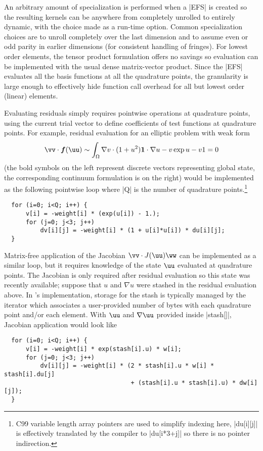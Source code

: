 An arbitrary amount of specialization is performed when a \cverb|EFS| is created so the resulting kernels can be anywhere from completely unrolled to entirely dynamic, with the choice made as a run-time option.
Common specialization choices are to unroll completely over the last dimension and to assume even or odd parity in earlier dimensions (for consistent handling of fringes).
For lowest order elements, the tensor product formulation offers no savings so evaluation can be implemented with the usual dense matrix-vector product.
Since the \cverb|EFS| evaluates all the basis functions at all the quadrature points, the granularity is large enough to effectively hide function call overhead for all but lowest order (linear) elements.

Evaluating residuals simply requires pointwise operations at quadrature points, using the current trial vector to define coefficients of test functions at quadrature points.
For example, residual evaluation for an elliptic problem with weak form
\begin{align*}
  \vv\cdot \bm f(\uu) \sim \int_\Omega \nabla v \cdot (1+u^2)\bm 1 \cdot \nabla u - v \exp u - v 1 = 0
\end{align*}
(the bold symbols on the left represent discrete vectors representing global state, the corresponding continuum formulation is on the right)
would be implemented as the following pointwise loop where \cverb|Q| is the number of quadrature points.\footnote{C99 variable length array pointers are used to simplify indexing here, \cverb|du[i][j]| is effectively translated by the compiler to \cverb|du[i*3+j]| so there is no pointer indirection.}
\begin{verbatim}
  for (i=0; i<Q; i++) {
      v[i] = -weight[i] * (exp(u[i]) - 1.);
      for (j=0; j<3; j++)
          dv[i][j] = -weight[i] * (1 + u[i]*u[i]) * du[i][j];
  }
\end{verbatim}
Matrix-free application of the Jacobian $\vv \cdot J(\uu) \ww$ can be implemented as a similar loop, but it requires knowledge of the state $\uu$ evaluated at quadrature points.
The Jacobian is only required after residual evaluation so this state was recently available; suppose that $u$ and $\nabla u$ were stashed in the residual evaluation above.
In \Dohp's implementation, storage for the stash is typically managed by the iterator which associates a user-provided number of bytes with each quadrature point and/or each element.
With $\uu$ and $\nabla\uu$ provided inside \cverb|stash[]|, Jacobian application would look like
\begin{verbatim}
  for (i=0; i<Q; i++) {
      v[i] = -weight[i] * exp(stash[i].u) * w[i];
      for (j=0; j<3; j++)
          dv[i][j] = -weight[i] * (2 * stash[i].u * w[i] * stash[i].du[j]
                                   + (stash[i].u * stash[i].u) * dw[i][j]);
  }
\end{verbatim}

